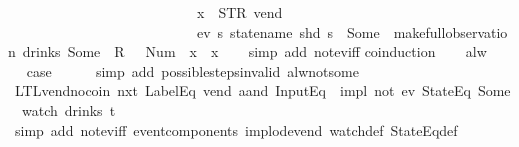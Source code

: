 \begin{isabellebody}
\ \ \ \ \ \ \ \ \ \ \ \ \ \ \ \ \ \ \ \ \ \ \ \ \ \ \ x{}\ {\isasymnoteq}\ {\isacharparenleft}STR\ {\isacharprime}{\isacharprime}vend{\isacharprime}{\isacharprime}{\isacharcomma}\ {\isacharbrackleft}{\isacharbrackright}{\isacharparenright}\ {\isasymLongrightarrow}\isanewline
\ \ \ \ \ \ \ \ \ \ \ \ \ \ \ \ \ \ \ \ \ \ \ \ \ \ \ {\isasymnot}ev\ {\isacharparenleft}{\isasymlambda}s{\isachardot}\ statename\ {\isacharparenleft}shd\ s{\isacharparenright}\ {\isacharequal}\ Some\ {}{\isacharparenright}\ {\isacharparenleft}make{\isacharunderscore}full{\isacharunderscore}observation\ drinks\ {\isacharparenleft}Some\ {}{\isacharparenright}\ {\isacharless}R\ {}\ {\isacharcolon}{\isacharequal}\ Num\ {}{\isachargreater}\ {\isacharparenleft}x{}\ {\isacharhash}{\isacharhash}\ x{}{\isacharparenright}{\isacharparenright}{\isachardoublequoteclose}\isanewline
%
\isadelimproof
\ \ %
\endisadelimproof
%
\isatagproof
{}\isamarkupfalse%
\ {\isacharparenleft}simp\ add{\isacharcolon}\ not{\isacharunderscore}ev{\isacharunderscore}iff{\isacharparenright}\isanewline
{}\isamarkupfalse%
{\isacharparenleft}coinduction{\isacharparenright}\isanewline
\ \ \isamarkupfalse%
\ alw\isanewline
\ \ \isamarkupfalse%
\ \isamarkupfalse%
\ {\isacharquery}case\isanewline
\ \ \ \ \isamarkupfalse%
\ {\isacharparenleft}simp\ add{\isacharcolon}\ possible{\isacharunderscore}steps{\isacharunderscore}{}{\isacharunderscore}invalid\ alw{\isacharunderscore}not{\isacharunderscore}some{\isacharparenright}\isanewline
{}\isamarkupfalse%
%
\endisatagproof
{\isafoldproof}%
%
\isadelimproof
\isanewline
%
\endisadelimproof
\isanewline
{}\isamarkupfalse%
\ LTL{\isacharunderscore}vend{\isacharunderscore}no{\isacharunderscore}coin{\isacharcolon}\ {\isachardoublequoteopen}{\isacharparenleft}{\isacharparenleft}nxt\ {\isacharparenleft}LabelEq\ {\isacharprime}{\isacharprime}vend{\isacharprime}{\isacharprime}\ aand\ InputEq\ {\isacharbrackleft}{\isacharbrackright}{\isacharparenright}{\isacharparenright}\ impl\ not\ {\isacharparenleft}ev\ {\isacharparenleft}StateEq\ {\isacharparenleft}Some\ {}{\isacharparenright}{\isacharparenright}{\isacharparenright}{\isacharparenright}\ {\isacharparenleft}watch\ drinks\ t{\isacharparenright}{\isachardoublequoteclose}\isanewline
%
\isadelimproof
\ \ %
\endisadelimproof
%
\isatagproof
{}\isamarkupfalse%
\ {\isacharparenleft}simp\ add{\isacharcolon}\ not{\isacharunderscore}ev{\isacharunderscore}iff\ event{\isacharunderscore}components\ implode{\isacharunderscore}vend\ watch{\isacharunderscore}def\ StateEq{\isacharunderscore}def{\isacharparenright}\isanewline

\end{isabellebody}
